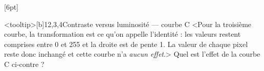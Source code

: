 \begin{quiz}[title={Photographie numérique}]
\vspace{-.5\baselineskip}
[6pt]%
\begin{quizquestion*}<tooltip>[b]{1}{2,3,4}{Contraste {\upshape versus} luminosité --- courbe C}
<Pour la troisième courbe, la transformation est ce qu'on appelle l'identité : les valeurs restent comprises entre 0 et 255 et la droite est de pente 1. La valeur de chaque pixel reste donc inchangé et cette courbe n'a \emph{aucun effet}.>
Quel est l'effet de la courbe C ci-contre ?
\end{quizquestion*}


\end{quiz}
